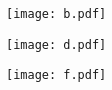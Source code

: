 

\pagestyle{plain}



\texttt{[image: b.pdf]}

\texttt{[image: d.pdf]}

\texttt{[image: f.pdf]}




